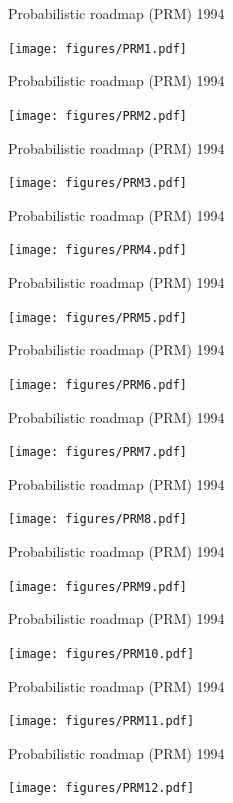 \begin{frame} {Probabilistic roadmap (PRM) 1994}
\centerline {
  \texttt{[image: figures/PRM1.pdf]}
}
\end{frame}

\begin{frame} {Probabilistic roadmap (PRM) 1994}
\centerline {
  \texttt{[image: figures/PRM2.pdf]}
}
\end{frame}

\begin{frame} {Probabilistic roadmap (PRM) 1994}
\centerline {
  \texttt{[image: figures/PRM3.pdf]}
}
\end{frame}

\begin{frame} {Probabilistic roadmap (PRM) 1994}
\centerline {
  \texttt{[image: figures/PRM4.pdf]}
}
\end{frame}

\begin{frame} {Probabilistic roadmap (PRM) 1994}
\centerline {
  \texttt{[image: figures/PRM5.pdf]}
}
\end{frame}

\begin{frame} {Probabilistic roadmap (PRM) 1994}
\centerline {
  \texttt{[image: figures/PRM6.pdf]}
}
\end{frame}

\begin{frame} {Probabilistic roadmap (PRM) 1994}
\centerline {
  \texttt{[image: figures/PRM7.pdf]}
}
\end{frame}

\begin{frame} {Probabilistic roadmap (PRM) 1994}
\centerline {
  \texttt{[image: figures/PRM8.pdf]}
}
\end{frame}

\begin{frame} {Probabilistic roadmap (PRM) 1994}
\centerline {
  \texttt{[image: figures/PRM9.pdf]}
}
\end{frame}

\begin{frame} {Probabilistic roadmap (PRM) 1994}
\centerline {
  \texttt{[image: figures/PRM10.pdf]}
}
\end{frame}

\begin{frame} {Probabilistic roadmap (PRM) 1994}
\centerline {
  \texttt{[image: figures/PRM11.pdf]}
}
\end{frame}

\begin{frame} {Probabilistic roadmap (PRM) 1994}
\centerline {
  \texttt{[image: figures/PRM12.pdf]}
}
\end{frame}

